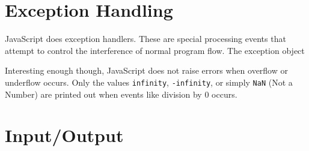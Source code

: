 \documentclass[man]{apa}
\begin{document}
\section{Exception Handling}

JavaScript does exception handlers. These are special processing events that attempt to control the interference of normal program flow. The exception object



Interesting enough though, JavaScript does not raise errors when overflow or underflow occurs. Only the values \texttt{infinity}, \texttt{-infinity}, or simply \texttt{NaN} (Not a Number) are printed out when events like division by $ 0 $ occurs.

\section{Input/Output}






\end{document}
